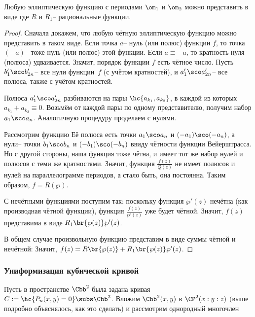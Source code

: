\documentclass[a4paper]{article}
\begin{document}
\begin{theorem}
Любую эллиптическую функцию с периодами $\om_1$ и $\om_2$ можно представить в виде
где $R$ и $R_1$-- рациональные функции.
\end{theorem}
\begin{proof}
Сначала докажем, что любую чётную эллиптическую функцию можно представить в таком виде.
Если точка $a$-- нуль (или полюс) функции $f$, то точка $(-a)$-- тоже нуль (или полюс)
этой функции. Если $a \equiv -a$, то кратность нуля (полюса) удваивается. Значит,
порядок функции $f$ есть чётное число. Пусть $b'_1\sco b'_{2n}$-- все нули функции~$f$
(с учётом кратностей), и $a'_1\sco a'_{2n}$-- все полюса, также с учётом кратностей.

Полюса $a'_1\sco a'_{2n}$ разбиваются на пары $\hc{a_{k_1},a_{k_2}}$, в каждой
из которых $a_{k_1} + a_{k_2}\equiv 0$. Возьмём от каждой пары по одному представителю,
получим набор $a_1\sco a_n$. Аналогичную процедуру проделаем с нулями.

Рассмотрим функцию
Её полюса есть точки $a_1\sco a_n$ и $(-a_1)\sco (-a_n)$, а нули-- точки
$b_1\sco b_n$ и $(-b_1)\sco (-b_n)$ ввиду чётности функции Вейерштрасса. Но с другой
стороны, наша функция тоже чётна, и имеет тот же набор нулей и полюсов с теми же
кратностями. Значит, функция $\frac{f(z)}{Q(z)}$ не имеет полюсов и нулей на параллелограмме
периодов, а стало быть, она постоянна. Таким образом, $f = R(\wp)$.

С нечётными функциями поступим так: поскольку функция $\wp'(z)$ нечётна (как
производная чётной функции), функция $\frac{f(z)}{\wp'(z)}$ уже будет чётной.
Значит, $f(z)$ представима в виде $R_1\br{\wp(z)}\wp'(z)$.

В общем случае произвольную функцию представим в виде суммы чётной и нечётной:
Значит, $f(z) = R\br{\wp(z)}+R_1\br{\wp(z)}\wp'(z)$.
\end{proof}

\subsubsection{Униформизация кубической кривой}

Пусть в пространстве $\Cbb^2$ была задана кривая $C := \hc{P_n(x,y)=0}\subs\Cbb^2$.
Вложим $\Cbb^2(x,y)$ в $\CP^2(x:y:z)$ (выше подробно объяснялось, как это
сделать) и рассмотрим однородный многочлен
\end{document}
